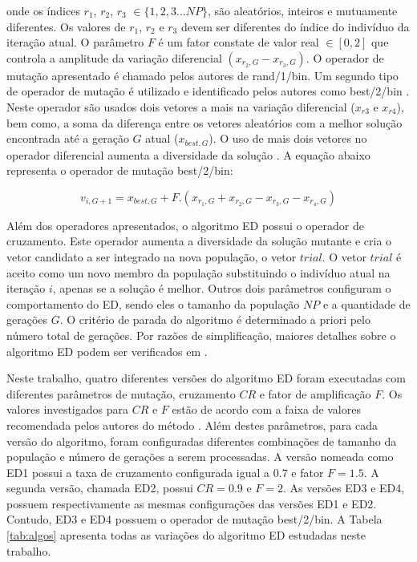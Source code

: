 \documentclass[12pt,A4,A4pt]{article}
\begin{document}
onde os índices $r_{1}$, $r_{2}$, $r_{3}$ $\in \{1,2,3 ...NP\}$, são aleatórios, inteiros e mutuamente diferentes. Os valores de $r_{1}$, $r_{2}$ e $r_{3}$ devem ser diferentes do índice do indivíduo da iteração atual. O parâmetro $F$ é um fator constate de valor real $\in [0,2]$ que controla a amplitude da variação diferencial $(x_{r_{2},G} - x_{r_{3},G})$. O operador de mutação apresentado é chamado pelos autores de rand/1/bin. Um segundo tipo de operador de mutação é utilizado e identificado pelos autores como best/2/bin \citep{Storn1997}. Neste operador são usados dois vetores a mais na variação diferencial ($x_{r3}$ e $x_{r4}$), bem como, a soma da diferença entre os vetores aleatórios com a melhor solução encontrada até a geração $G$ atual ($x_{{best},G}$). O uso de mais dois vetores no operador diferencial aumenta a diversidade da solução  \citep{Storn1997}. A equação abaixo representa o operador de mutação best/2/bin:

\begin{equation}
v_{i,G+1} = x_{{best},G} + F . (x_{r_{1},G} + x_{r_{2},G} - x_{r_{3},G} - x_{r_{4},G}) \label{trial2}
\end{equation}


Além dos operadores apresentados, o algoritmo ED possui o operador de cruzamento. Este operador aumenta a diversidade da solução mutante e cria o vetor candidato a ser integrado na nova população, o vetor $trial$. O vetor $trial$ é aceito como um novo membro da população substituindo o indivíduo atual na iteração $i$, apenas se a solução é melhor. Outros dois parâmetros configuram o comportamento do ED, sendo eles o tamanho da população $NP$ e a quantidade de gerações $G$. O critério de parada do algoritmo é determinado a priori pelo número total de gerações. Por razões de simplificação, maiores detalhes sobre o algoritmo ED podem ser verificados em \cite{Storn1997}.

Neste trabalho, quatro diferentes versões do algoritmo ED foram executadas com diferentes parâmetros de mutação, cruzamento $CR$ e fator de amplificação $F$. Os valores investigados para $CR$ e $F$ estão de acordo com a faixa de  valores recomendada pelos autores do método \citep{Storn1997}. Além destes parâmetros, para cada versão do algoritmo, foram configuradas diferentes combinações de tamanho da população e número de gerações a serem processadas. A versão nomeada como ED1 possui a taxa de cruzamento  configurada igual a $0.7$ e fator $F = 1.5$. A segunda versão, chamada ED2, possui $CR = 0.9$ e $F = 2$. As versões ED3 e
ED4, possuem respectivamente as mesmas configurações das versões ED1 e ED2. Contudo, ED3 e ED4 possuem o operador de mutação best/2/bin. A Tabela \ref{tab:algos} apresenta todas as variações do algoritmo ED estudadas neste trabalho.
\end{document}

